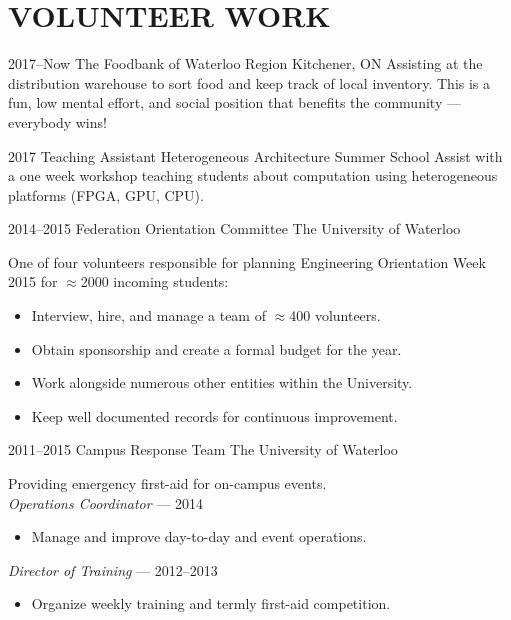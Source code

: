 \documentclass[a4paper,nocolors]{cv-friggeri-ben}
\begin{document}
\section{VOLUNTEER WORK}
\vspace{-2pt}
\begin{entrylist}

\entry
    {2017--Now}
    {The Foodbank of Waterloo Region}
    {Kitchener, ON}
    {Assisting at the distribution warehouse to sort food and keep track of
    local inventory. This is a fun, low mental effort, and social position that
    benefits the community --- everybody wins!}

\entry
    {2017}
    {Teaching Assistant}
    {Heterogeneous Architecture Summer School}
    {Assist with a one week workshop teaching students about computation using
    heterogeneous platforms (FPGA, GPU, CPU).}

\entry
    {2014--2015}
    {Federation Orientation Committee}
    {The University of Waterloo}
    {One of four volunteers responsible for planning Engineering Orientation
    Week 2015 for $\approx$2000 incoming students:
    \begin{itemize}
        \item Interview, hire, and manage a team of $\approx$400 volunteers.
        \item Obtain sponsorship and create a formal budget for the year.
        \item Work alongside numerous other entities within the University.
        \item Keep well documented records for continuous improvement.
    \end{itemize}}

\entry
    {2011--2015}
    {Campus Response Team}
    {The University of Waterloo}
    {Providing emergency first-aid for on-campus events.\\
    \emph{Operations Coordinator} --- 2014
    \begin{itemize}
        \item Manage and improve day-to-day and event operations.
    \end{itemize}
    \emph{Director of Training} --- 2012--2013
    \begin{itemize}
        \item Organize weekly training and termly first-aid competition.
    \end{itemize}}

\end{entrylist}
\end{document}
